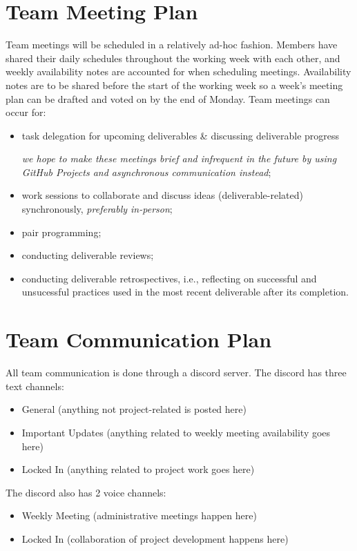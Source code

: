 \documentclass{article}
\begin{document}
\section{Team Meeting Plan}
Team meetings will be scheduled in a relatively ad-hoc fashion. Members have shared their daily schedules throughout the working week with each other, and weekly availability notes are accounted for when scheduling meetings. Availability notes are to be shared before the start of the working week so a week's meeting plan can be drafted and voted on by the end of Monday. Team meetings can occur for:
\begin{itemize}
  \item task delegation for upcoming deliverables \& discussing deliverable progress
  
  \emph{we hope to make these meetings brief and infrequent in the future by using GitHub Projects and asynchronous communication instead};
  \item work sessions to collaborate and discuss ideas (deliverable-related) synchronously, \emph{preferably in-person};
  \item pair programming;
  \item conducting deliverable reviews;
  \item conducting deliverable retrospectives, i.e., reflecting on successful and unsucessful practices used in the most recent deliverable after its completion.
\end{itemize}

\section{Team Communication Plan}
All team communication is done through a discord server. The discord has three text channels:
\begin{itemize}
  \item General (anything not project-related is posted here)
  \item Important Updates (anything related to weekly meeting availability goes here)
  \item Locked In (anything related to project work goes here)
\end{itemize}
\noindent
The discord also has 2 voice channels:

\begin{itemize}
  \item Weekly Meeting (administrative meetings happen here)
  \item Locked In (collaboration of project development happens here)
\end{itemize}
\end{document}
